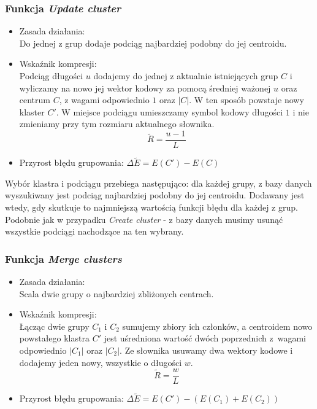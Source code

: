 \documentclass{article}
\theoremstyle{definition}
\begin{document}

\subsubsection{Funkcja \textit{Update cluster}} 

\begin{itemize}

\item Zasada działania: \\
Do jednej z grup dodaje podciąg najbardziej podobny do jej centroidu.

\item Wskaźnik kompresji: \\
Podciąg długości $u$ dodajemy do jednej z aktualnie istniejących grup $C$ i wyliczamy na nowo jej wektor kodowy za pomocą średniej ważonej $u$ oraz centrum $C$, z wagami odpowiednio $1$ oraz $|C|$. W ten sposób powstaje nowy klaster $C'$.
W miejsce podciągu umieszczamy symbol kodowy długości $1$ i nie zmieniamy przy tym rozmiaru aktualnego słownika.
$$\tilde{R} = \frac{u - 1}{L}$$
    
\item Przyrost błędu grupowania: $\Delta \tilde{E} = E(C') - E(C)$

\end{itemize}

Wybór klastra i podciągu przebiega następująco: dla każdej grupy, z bazy danych wyszukiwany jest podciąg najbardziej podobny do jej centroidu. Dodawany jest wtedy, gdy skutkuje to najmniejszą wartością funkcji błędu dla każdej z grup.
Podobnie jak w przypadku \textit{Create cluster} - z bazy danych musimy usunąć wszystkie podciągi nachodzące na ten wybrany.


\subsubsection{Funkcja \textit{Merge clusters}}

\begin{itemize}
\item Zasada działania: \\ 
Scala dwie grupy o najbardziej zbliżonych centrach.
\item Wskaźnik kompresji: \\
Łącząc dwie grupy $C_{1}$ i $C_{2}$ sumujemy zbiory ich członków, 
a centroidem nowo powstałego klastra $C'$ jest uśredniona wartość dwóch poprzednich z~wagami odpowiednio $|C_{1}|$ oraz $|C_{2}|$.
Ze słownika usuwamy dwa wektory kodowe i dodajemy jeden nowy, wszystkie o długości $w$.
$$\tilde{R} = \frac{w}{L} $$
\item Przyrost błędu grupowania: $\Delta \tilde{E} = E(C') - (E(C_{1}) + E(C_{2}))$

\end{itemize}
\end{document}
